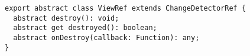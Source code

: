\begin{verbatim}
export abstract class ViewRef extends ChangeDetectorRef {
  abstract destroy(): void;
  abstract get destroyed(): boolean;
  abstract onDestroy(callback: Function): any;
}
\end{verbatim}
